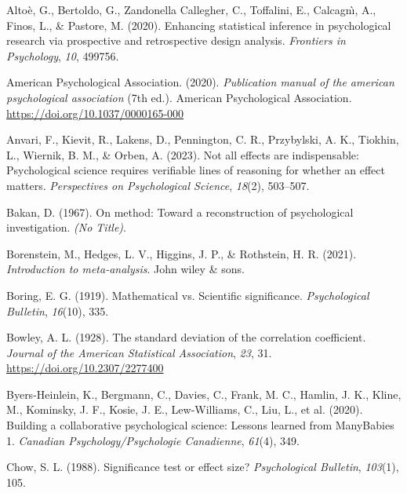 \documentclass[
  man,floatsintext]{apa7}
\newlength{\cslhangindent}
\newlength{\cslentryspacingunit} %
\newenvironment{CSLReferences}[2] %
 {%
  \setlength{\parindent}{0pt}
  \ifodd #1
  \let\oldpar\par
  \def\par{\hangindent=\cslhangindent\oldpar}
  \fi
  \setlength{\parskip}{#2\cslentryspacingunit}
 }%
 {}
\begin{document}
\hypertarget{refs}{}
\begin{CSLReferences}{1}{0}
\leavevmode{}%
Altoè, G., Bertoldo, G., Zandonella Callegher, C., Toffalini, E., Calcagnı̀, A., Finos, L., \& Pastore, M. (2020). Enhancing statistical inference in psychological research via prospective and retrospective design analysis. \emph{Frontiers in Psychology}, \emph{10}, 499756.

\leavevmode{}%
American Psychological Association. (2020). \emph{Publication manual of the american psychological association} (7th ed.). American Psychological Association. \url{https://doi.org/10.1037/0000165-000}

\leavevmode{}%
Anvari, F., Kievit, R., Lakens, D., Pennington, C. R., Przybylski, A. K., Tiokhin, L., Wiernik, B. M., \& Orben, A. (2023). Not all effects are indispensable: Psychological science requires verifiable lines of reasoning for whether an effect matters. \emph{Perspectives on Psychological Science}, \emph{18}(2), 503--507.

\leavevmode{}%
Bakan, D. (1967). On method: Toward a reconstruction of psychological investigation. \emph{(No Title)}.

\leavevmode{}%
Borenstein, M., Hedges, L. V., Higgins, J. P., \& Rothstein, H. R. (2021). \emph{Introduction to meta-analysis}. John wiley \& sons.

\leavevmode{}%
Boring, E. G. (1919). Mathematical vs. Scientific significance. \emph{Psychological Bulletin}, \emph{16}(10), 335.

\leavevmode{}%
Bowley, A. L. (1928). The standard deviation of the correlation coefficient. \emph{Journal of the American Statistical Association}, \emph{23}, 31. \url{https://doi.org/10.2307/2277400}

\leavevmode{}%
Byers-Heinlein, K., Bergmann, C., Davies, C., Frank, M. C., Hamlin, J. K., Kline, M., Kominsky, J. F., Kosie, J. E., Lew-Williams, C., Liu, L., et al. (2020). Building a collaborative psychological science: Lessons learned from ManyBabies 1. \emph{Canadian Psychology/Psychologie Canadienne}, \emph{61}(4), 349.

\leavevmode{}%
Chow, S. L. (1988). Significance test or effect size? \emph{Psychological Bulletin}, \emph{103}(1), 105.


\end{CSLReferences}
\end{document}
